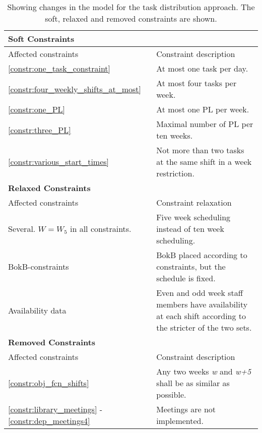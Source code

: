 \begin{table}[!h]
\centering
\caption{Showing changes in the model for the task distribution approach. The soft, relaxed and removed constraints are shown.}
\label{tab:task_constraints}
\begin{tabular}{|p{4cm}|p{7cm}|}
\hline
\multicolumn{2}{|l|}{\cellcolor{gray!90} \textbf{Soft Constraints}} \\
\hline 
\rowcolor{Gray} Affected constraints & Constraint description \\ \hline
\ref{constr:one_task_constraint} & At most one task per day.  \\ \hline
\ref{constr:four_weekly_shifts_at_most} & At most four tasks per week. \\ \hline
\ref{constr:one_PL} & At most one PL per week. \\ \hline
\ref{constr:three_PL} & Maximal number of PL per ten weeks. \\ \hline
\ref{constr:various_start_times} & Not more than two tasks at the same shift in a week restriction.  \\ \hline
\multicolumn{2}{|l|}{\cellcolor{gray!90} \textbf{Relaxed Constraints}} \\
\hline 
\rowcolor{Gray} Affected constraints & Constraint relaxation \\ \hline
Several. $W = W_5$ in all constraints. & Five week scheduling instead of ten week scheduling. \\ \hline
BokB-constraints & BokB placed according to constraints, but the schedule is fixed. \\ \hline
Availability data & Even and odd week staff members have availability at each shift according to the stricter of the two sets. \\ \hline
\multicolumn{2}{|l|}{\cellcolor{gray!90} \textbf{Removed Constraints}} \\
\hline 
\rowcolor{Gray} Affected constraints & Constraint description \\ \hline
\ref{constr:obj_fcn_shifts} & Any two weeks \textit{w} and \textit{w+5} shall be as similar as possible. \\ \hline
\ref{constr:library_meetings} - \ref{constr:dep_meetings4} & Meetings are not implemented. \\ \hline
\end{tabular}
\end{table}

